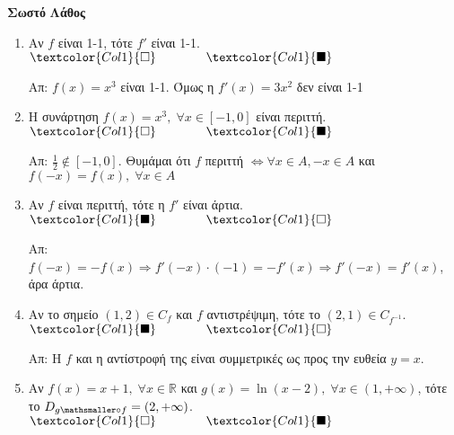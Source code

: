\documentclass[a4paper,table]{report}
\begin{document}
\begin{center}
  \minibox{\large\bfseries \textcolor{Col2}{Συναρτήσεις (Ερωτήσεις)}}
\end{center}


\vspace{\baselineskip}

\hfill \textcolor{Col1}{\textbf{Σωστό}} \quad \textcolor{Col1}{\textbf{Λάθος}}
\begin{enumerate}[itemsep=.5\baselineskip]
  \item \textcolor{Col1}{Αν $f$ είναι 1-1, τότε $ f' $ είναι 1-1}. 
    \hfill $\textcolor{Col1}{\square} \qquad \qquad \textcolor{Col1}{\blacksquare}$

    Απ: $ f(x)=x^{3} $ είναι 1-1. Όμως η $ f'(x) = 3x^{2} $ δεν είναι 1-1

  \item \textcolor{Col1}{Η συνάρτηση $ f(x)=x^{3}, \; \forall x \in [-1,0] $ 
    είναι περιττή}.
    \hfill $\textcolor{Col1}{\square} \qquad \qquad \textcolor{Col1}{\blacksquare}$

    Απ: $ \frac{1}{2} \not\in [-1,0] $. Θυμάμαι ότι $f$ περιττή 
    $ \Leftrightarrow \forall x \in A, -x \in A $ και $ f(-x)=f(x), \; \forall x \in A $ 

  \item \textcolor{Col1}{Αν $f$ είναι περιττή, τότε η $ f' $ είναι άρτια}.
    \hfill $\textcolor{Col1}{\blacksquare} \qquad \qquad \textcolor{Col1}{\square}$

    Απ: $ f(-x)=-f(x) \Rightarrow f'(-x)\cdot (-1) = - f'(x) \Rightarrow f'(-x) = f'(x)
    $, άρα άρτια.

  \item \textcolor{Col1}{Αν το σημείο $ (1,2) \in C_{f} $ και $f$ αντιστρέψιμη, 
    τότε το $ (2,1) \in C_{f^{-1}} $}.
    \hfill $\textcolor{Col1}{\blacksquare} \qquad \qquad \textcolor{Col1}{\square}$

    Απ: Η $f$ και η αντίστροφή της είναι συμμετρικές ως προς την ευθεία $ y=x $.

  \item \textcolor{Col1}{Αν $ f(x)=x+1, \; \forall x \in \mathbb{R} $ και 
      $ g(x)= \ln{(x-2)}, \; \forall x \in (1, + \infty) $, τότε το 
    $ D_{g \mathsmaller\circ f} = (2, + \infty) $}.
    \hfill $\textcolor{Col1}{\square} \qquad \qquad \textcolor{Col1}{\blacksquare}$


\end{enumerate}
\end{document}
